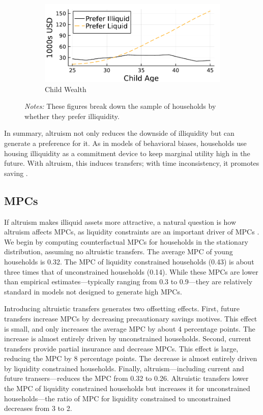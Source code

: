 \documentclass[12pt]{article}
\begin{document}
\begin{figure}[tb]
\begin{subfigure}{0.5\textwidth}
	\end{subfigure}%
	\hfill
	\begin{subfigure}{0.5\textwidth}%
		\caption{Child Wealth}\label{fig:pref_wealthk}%
		\includegraphics[width=\textwidth]{../tabfig/preferliq/prefer_wealthk.pdf}%
	\end{subfigure}%
	\caption*{\footnotesize \textit{Notes:} These figures break down the sample of households by whether they prefer illiquidity.}
\end{figure}

In summary, altruism not only reduces the downside of illiquidity but can generate a preference for it. As in models of behavioral biases, households use housing illiquidity as a commitment device to keep marginal utility high in the future. With altruism, this induces transfers; with time inconsistency, it promotes saving \citep{attanasio2024temptation}. 

\subsection{MPCs}
If altruism makes illiquid assets more attractive, a natural question is how altruism affects MPCs, as liquidity constraints are an important driver of MPCs \citep[see e.g.,][]{aguiar2024hand,Kaplan2014,fagereng2021mpc}. We begin by computing counterfactual MPCs for households in the stationary distribution, assuming no altruistic transfers. The average MPC of young households is 0.32. The MPC of liquidity constrained households (0.43) is about three times that of unconstrained households (0.14). While these MPCs are lower than empirical estimates---typically ranging from 0.3 to 0.9---they are relatively standard in models not designed to generate high MPCs. 

Introducing altruistic transfers generates two offsetting effects. First, future transfers increase MPCs by decreasing precautionary savings motives. This effect is small, and only increases the average MPC by about 4 percentage points. The increase is almost entirely driven by unconstrained households. Second, current transfers provide partial insurance and decrease MPCs. This effect is large, reducing the MPC by 8 percentage points. The decrease is almost entirely driven by liquidity constrained households. Finally, altruism---including current and future transers---reduces the MPC from 0.32 to 0.26. Altruistic transfers lower the MPC of liquidity constrained households but increases it for unconstrained households---the ratio of MPC for liquidity constrained to unconstrained decreases from 3 to 2.
\end{document}
